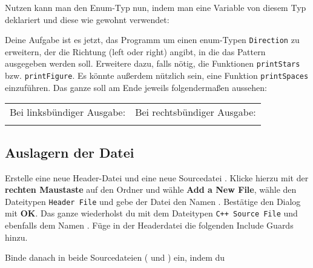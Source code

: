 

Nutzen kann man den Enum-Typ nun, indem man eine Variable von diesem Typ deklariert und diese wie gewohnt verwendet:



Deine Aufgabe ist es jetzt, das Programm um einen enum-Typen \lstinline{Direction} zu erweitern, der die Richtung (left oder right) angibt, in die das Pattern ausgegeben werden soll. Erweitere dazu, falls nötig, die Funktionen \lstinline{printStars} bzw. \lstinline{printFigure}. Es könnte außerdem nützlich sein, eine Funktion \lstinline{printSpaces} einzuführen.
Das ganze soll am Ende jeweils folgendermaßen aussehen:

\medskip
\begin{center}
\begin{tabular}{c@{\hskip 1in}c}
Bei linksbündiger Ausgabe: & Bei rechtsbündiger Ausgabe: \\
 &  \\
\end{tabular}
\end{center}
\medskip

\subsection{Auslagern der Datei}
Erstelle eine neue Header-Datei \textbf{} und eine neue
Sourcedatei \textbf{}.
Klicke hierzu mit der \textbf{rechten Maustaste} auf den Ordner \textbf{} und wähle \textbf{Add a New File}, wähle den Dateitypen \texttt{Header File} und gebe der Datei den Namen . 
Bestätige den Dialog mit \textbf{OK}.
Das ganze wiederholst du mit dem Dateitypen \texttt{C++ Source File} und ebenfalls dem Namen .
Füge in der Headerdatei die folgenden Include Guards hinzu.



Binde danach  in beide Sourcedateien ( und ) ein, indem du




